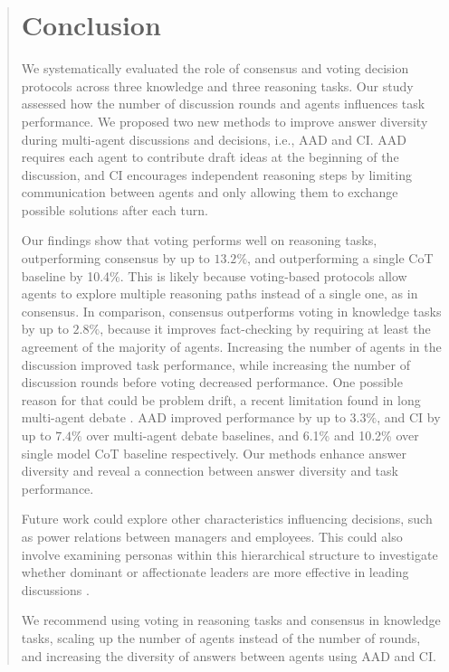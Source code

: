 \documentclass[11pt]{article}
\begin{document}
\begin{abstract}
\section{Conclusion}

We systematically evaluated the role of consensus and voting decision protocols across three knowledge and three reasoning tasks.
Our study assessed how the number of discussion rounds and agents influences task performance.
We proposed two new methods to improve answer diversity during multi-agent discussions and decisions, i.e., \acf{AAD} and \acf{CI}. 
\ac{AAD} requires each agent to contribute draft ideas at the beginning of the discussion, and \ac{CI} encourages independent reasoning steps by limiting communication between agents and only allowing them to exchange possible solutions after each turn.

Our findings show that voting performs well on reasoning tasks, outperforming consensus by up to $13.2\%$, and outperforming a single \ac{CoT} baseline by 10.4\%.
This is likely because voting-based protocols allow agents to explore multiple reasoning paths instead of a single one, as in consensus.
In comparison, consensus outperforms voting in knowledge tasks by up to $2.8\%$, because it improves fact-checking by requiring at least the agreement of the majority of agents.
Increasing the number of agents in the discussion improved task performance, while increasing the number of discussion rounds before voting decreased performance.
One possible reason for that could be problem drift, a recent limitation found in long multi-agent debate \cite{becker_multi-agent_2024}.
\ac{AAD} improved performance by up to $3.3\%$, and \ac{CI} by up to $7.4\%$ over multi-agent debate baselines, and 6.1\% and 10.2\% over single model \ac{CoT} baseline respectively.
Our methods enhance answer diversity and reveal a connection between answer diversity and task performance.

Future work could explore other characteristics influencing decisions, such as power relations between managers and employees. 
This could also involve examining personas within this hierarchical structure to investigate whether dominant or affectionate leaders are more effective in leading discussions \citep{AMES2009111}.


We recommend using voting in reasoning tasks and consensus in knowledge tasks, scaling up the number of agents instead of the number of rounds, and increasing the diversity of answers between agents using \ac{AAD} and \ac{CI}.


\end{abstract}
\end{document}

